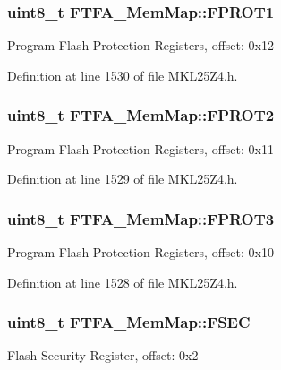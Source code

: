 \subsubsection[{\texorpdfstring{F\+P\+R\+O\+T1}{FPROT1}}]{\setlength{\rightskip}{0pt plus 5cm}uint8\+\_\+t F\+T\+F\+A\+\_\+\+Mem\+Map\+::\+F\+P\+R\+O\+T1}\hypertarget{struct_f_t_f_a___mem_map_a74c0cb8e137d3f4df7283f4b15203845}{}\label{struct_f_t_f_a___mem_map_a74c0cb8e137d3f4df7283f4b15203845}
Program Flash Protection Registers, offset\+: 0x12 

Definition at line 1530 of file M\+K\+L25\+Z4.\+h.

\subsubsection[{\texorpdfstring{F\+P\+R\+O\+T2}{FPROT2}}]{\setlength{\rightskip}{0pt plus 5cm}uint8\+\_\+t F\+T\+F\+A\+\_\+\+Mem\+Map\+::\+F\+P\+R\+O\+T2}\hypertarget{struct_f_t_f_a___mem_map_a86f1c8547579b9a1b381c2f7fdaf03ef}{}\label{struct_f_t_f_a___mem_map_a86f1c8547579b9a1b381c2f7fdaf03ef}
Program Flash Protection Registers, offset\+: 0x11 

Definition at line 1529 of file M\+K\+L25\+Z4.\+h.

\subsubsection[{\texorpdfstring{F\+P\+R\+O\+T3}{FPROT3}}]{\setlength{\rightskip}{0pt plus 5cm}uint8\+\_\+t F\+T\+F\+A\+\_\+\+Mem\+Map\+::\+F\+P\+R\+O\+T3}\hypertarget{struct_f_t_f_a___mem_map_ad373eeb57136eb15831fa521d94d7858}{}\label{struct_f_t_f_a___mem_map_ad373eeb57136eb15831fa521d94d7858}
Program Flash Protection Registers, offset\+: 0x10 

Definition at line 1528 of file M\+K\+L25\+Z4.\+h.

\subsubsection[{\texorpdfstring{F\+S\+EC}{FSEC}}]{\setlength{\rightskip}{0pt plus 5cm}uint8\+\_\+t F\+T\+F\+A\+\_\+\+Mem\+Map\+::\+F\+S\+EC}\hypertarget{struct_f_t_f_a___mem_map_a9595f5c1181b22cc6411876706f38409}{}\label{struct_f_t_f_a___mem_map_a9595f5c1181b22cc6411876706f38409}
Flash Security Register, offset\+: 0x2 


